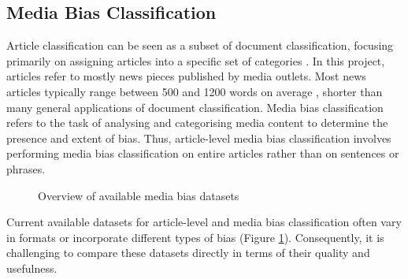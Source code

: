 \subsection{Media Bias Classification}

Article classification can be seen as a subset of document classification, focusing primarily on assigning articles into a specific set of categories \cite{dien-2019-article-classification}. In this project, articles refer to mostly news pieces published by media outlets. Most news articles typically range between 500 and 1200 words on average \cite{newswhip-2013-article-length}, shorter than many general applications of document classification. Media bias classification refers to the task of analysing and categorising media content to determine the presence and extent of bias. Thus, article-level media bias classification involves performing media bias classification on entire articles rather than on sentences or phrases.

\begin{figure}[htbp]
    \centering
    \caption{Overview of available media bias datasets \cite{rodrigo-2024-systematic-review-media-bias}}
    \label{fig:media-bias-datasets-overview}
\end{figure}

Current available datasets for article-level and media bias classification often vary in formats or incorporate different types of bias \cite{rodrigo-2024-systematic-review-media-bias} (Figure \ref{fig:media-bias-datasets-overview}). Consequently, it is challenging to compare these datasets directly in terms of their quality and usefulness.

